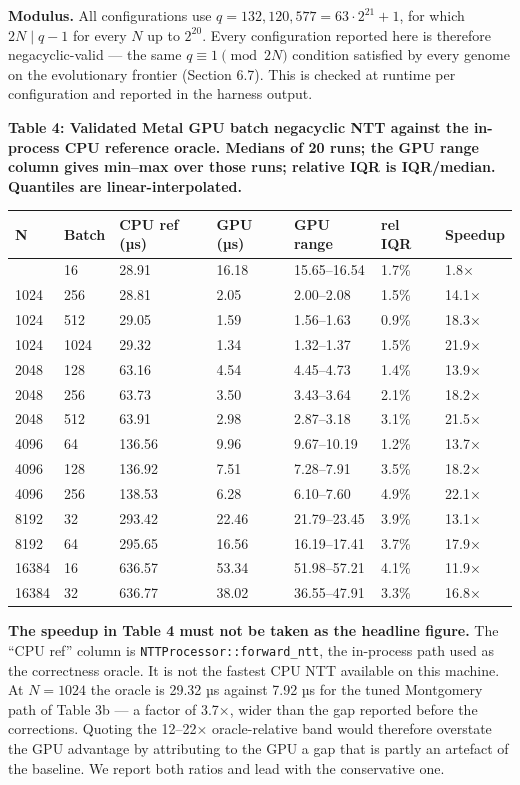 \textbf{Modulus.} All configurations use \(q = 132{,}120{,}577 = 63 \cdot 2^{21} + 1\), for which \(2N \mid q - 1\) for every \(N\) up to \(2^{20}\). Every configuration reported here is therefore negacyclic-valid --- the same \(q \equiv 1 \pmod{2N}\) condition satisfied by every genome on the evolutionary frontier (Section 6.7). This is checked at runtime per configuration and reported in the harness output.

\textbf{Table 4: Validated Metal GPU batch negacyclic NTT against the in-process CPU reference oracle. Medians of 20 runs; the GPU range column gives min--max over those runs; relative IQR is IQR/median. Quantiles are linear-interpolated.}

{\def\LTcaptype{none} %
\begin{longtable}[]{@{}lllllll@{}}
\toprule\noalign{}
N & Batch & CPU ref (µs) & GPU (µs) & GPU range & rel IQR & Speedup \\
\midrule\noalign{}
\endhead
\bottomrule\noalign{}
\endlastfoot
1024 & 16 & 28.91 & 16.18 & 15.65--16.54 & 1.7\% & 1.8× \\
1024 & 256 & 28.81 & 2.05 & 2.00--2.08 & 1.5\% & 14.1× \\
1024 & 512 & 29.05 & 1.59 & 1.56--1.63 & 0.9\% & 18.3× \\
1024 & 1024 & 29.32 & 1.34 & 1.32--1.37 & 1.5\% & 21.9× \\
2048 & 128 & 63.16 & 4.54 & 4.45--4.73 & 1.4\% & 13.9× \\
2048 & 256 & 63.73 & 3.50 & 3.43--3.64 & 2.1\% & 18.2× \\
2048 & 512 & 63.91 & 2.98 & 2.87--3.18 & 3.1\% & 21.5× \\
4096 & 64 & 136.56 & 9.96 & 9.67--10.19 & 1.2\% & 13.7× \\
4096 & 128 & 136.92 & 7.51 & 7.28--7.91 & 3.5\% & 18.2× \\
4096 & 256 & 138.53 & 6.28 & 6.10--7.60 & 4.9\% & 22.1× \\
8192 & 32 & 293.42 & 22.46 & 21.79--23.45 & 3.9\% & 13.1× \\
8192 & 64 & 295.65 & 16.56 & 16.19--17.41 & 3.7\% & 17.9× \\
16384 & 16 & 636.57 & 53.34 & 51.98--57.21 & 4.1\% & 11.9× \\
16384 & 32 & 636.77 & 38.02 & 36.55--47.91 & 3.3\% & 16.8× \\
\end{longtable}
}

\textbf{The speedup in Table 4 must not be taken as the headline figure.} The ``CPU ref'' column is \texttt{NTTProcessor::forward\_ntt}, the in-process path used as the correctness oracle. It is not the fastest CPU NTT available on this machine. At \(N = 1024\) the oracle is 29.32 µs against 7.92 µs for the tuned Montgomery path of Table 3b --- a factor of 3.7×, wider than the gap reported before the corrections. Quoting the 12--22× oracle-relative band would therefore overstate the GPU advantage by attributing to the GPU a gap that is partly an artefact of the baseline. We report both ratios and lead with the conservative one.

